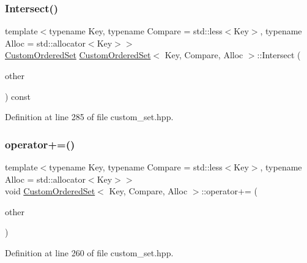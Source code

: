 \subsubsection{\texorpdfstring{Intersect()}{Intersect()}}
{\footnotesize\ttfamily template$<$typename Key, typename Compare = std\+::less$<$\+Key$>$, typename Alloc = std\+::allocator$<$\+Key$>$$>$ \\
\hyperlink{classCustomOrderedSet}{Custom\+Ordered\+Set} \hyperlink{classCustomOrderedSet}{Custom\+Ordered\+Set}$<$ Key, Compare, Alloc $>$\+::Intersect (\begin{DoxyParamCaption}\item[{const \hyperlink{classCustomOrderedSet}{Custom\+Ordered\+Set}$<$ Key, Compare, Alloc $>$ \&}]{other }\end{DoxyParamCaption}) const\hspace{0.3cm}{\ttfamily [inline]}}



Definition at line 285 of file custom\+\_\+set.\+hpp.

\mbox{\label{classCustomOrderedSet_a6a381bb474a00bb1f74c96e58f439732}} 
\subsubsection{\texorpdfstring{operator+=()}{operator+=()}}
{\footnotesize\ttfamily template$<$typename Key, typename Compare = std\+::less$<$\+Key$>$, typename Alloc = std\+::allocator$<$\+Key$>$$>$ \\
void \hyperlink{classCustomOrderedSet}{Custom\+Ordered\+Set}$<$ Key, Compare, Alloc $>$\+::operator+= (\begin{DoxyParamCaption}\item[{const \hyperlink{classCustomOrderedSet}{Custom\+Ordered\+Set}$<$ Key, Compare, Alloc $>$ \&}]{other }\end{DoxyParamCaption})\hspace{0.3cm}{\ttfamily [inline]}}



Definition at line 260 of file custom\+\_\+set.\+hpp.

\mbox{\label{classCustomOrderedSet_a4e843344380526ce70dffa839722ff52}} 
